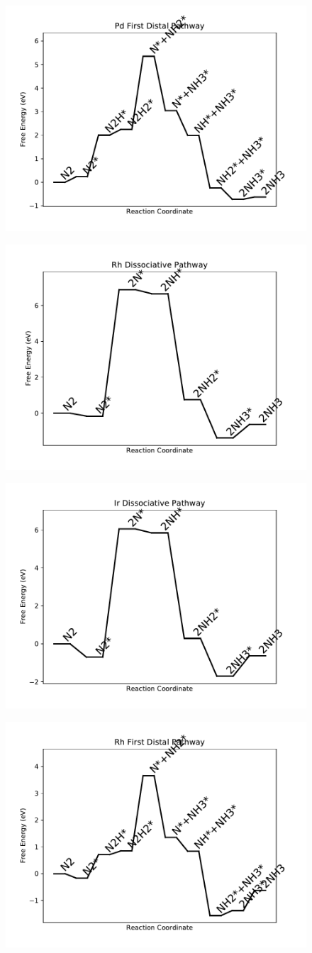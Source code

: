 \documentclass[journal=jacsat,manuscript=article]{achemso}
\begin{document}
\begin{figure}
\includegraphics[width=0.5\linewidth]{data/plots/Pd_distal_1.pdf}
\label{fig:Pd_distal_1}
\end{figure}

\newpage
\begin{figure}
\includegraphics[width=0.5\linewidth]{data/plots/Rh_dissociative.pdf}
\label{fig:Rh_dissociative}
\end{figure}

\begin{figure}
\includegraphics[width=0.5\linewidth]{data/plots/Ir_dissociative.pdf}
\label{fig:Ir_dissociative}
\end{figure}

\newpage
\begin{figure}
\includegraphics[width=0.5\linewidth]{data/plots/Rh_distal_1.pdf}
\label{fig:Rh_distal_1}
\end{figure}
\end{document}
